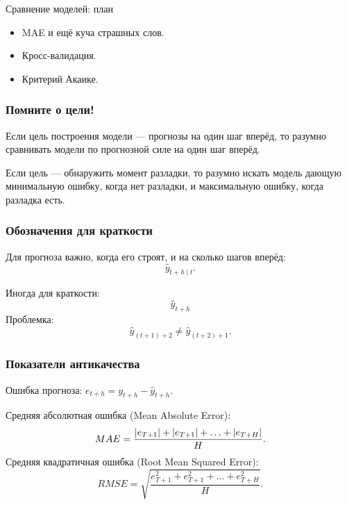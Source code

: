 
\begin{frame} %


\end{frame}



\begin{frame}{Сравнение моделей: план}
  \begin{itemize}[<+->]
    \item MAE и ещё куча страшных слов. 
    \item Кросс-валидация.
    \item Критерий Акаике.
  \end{itemize}

\end{frame}


\begin{frame}
  \frametitle{Помните о цели!}

  Если цель построения модели — прогнозы на один шаг вперёд, 
  то разумно сравнивать модели по прогнозной силе на один шаг вперёд. 

  \pause
  Если цель — обнаружить момент разладки,
  то разумно искать модель дающую минимальную ошибку, когда нет разладки, 
  и максимальную ошибку, когда разладка есть. 

\end{frame}

\begin{frame}
    \frametitle{Обозначения для краткости}

    Для прогноза важно, \alert{когда} его строят, и на \alert{сколько шагов вперёд}:
    \[
    \hat y_{t+h \mid t}.    
    \]

    \pause 
    Иногда для \alert{краткости}:
    \[
    \hat y_{t+h}    
    \]
    \pause 
    Проблемка:
    \[
    \hat y_{(t+1) + 2} \neq \hat y_{(t+2) + 1}.    
    \]    
    
\end{frame}


\begin{frame}
    \frametitle{Показатели антикачества}

    \alert{Ошибка прогноза}: $e_{t+h} = y_{t+h} - \hat y_{t+h}$.

    \pause
    \alert{Средняя абсолютная ошибка} (Mean Absolute Error):
    \[
    MAE = \frac{\abs {e_{T+1}} + \abs{e_{T+1}}+ \ldots + \abs{e_{T+H}} }{H}.
    \]
    \pause
    \alert{Средняя квадратичная ошибка} (Root Mean Squared Error):
    \[
        RMSE = \sqrt{ \frac{e^2_{T+1} + e^2_{T+1}+ \ldots + e^2_{T+H} }{H} }.
    \]
    
\end{frame}


